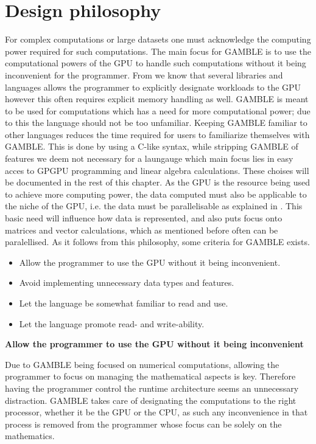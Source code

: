 \section{Design philosophy}
For complex computations or large datasets one must acknowledge the computing power required for such computations.
The main focus for GAMBLE is to use the computational powers of the GPU to handle such computations without it being inconvenient for the programmer.
From  we know that several libraries and languages allows the programmer to explicitly designate workloads to the GPU however this often requires explicit memory handling as well.
GAMBLE is meant to be used for computations which has a need for more computational power; due to this the language should not be too unfamiliar.
Keeping GAMBLE familiar to other languages reduces the time required for users to familiarize themselves with GAMBLE.
This is done by using a C-like syntax, while stripping GAMBLE of features we deem not necessary for a laungauge which main focus lies in easy acces to GPGPU programming and linear algebra calculations.
These choises will be documented in the rest of this chapter.
As the GPU is the resource being used to achieve more computing power, the data computed must also be applicable to the niche of the GPU, i.e. the data must be parallelisable as explained in .
This basic need will influence how data is represented, and also puts focus onto matrices and vector calculations, which as mentioned before often can be paralellised.
As it follows from this philosophy, some criteria for GAMBLE exists.
\begin{itemize}
	\item Allow the programmer to use the GPU without it being inconvenient.
	\item Avoid implementing unnecessary data types and features.
	\item Let the language be somewhat familiar to read and use.
	\item Let the language promote read- and write-ability.
\end{itemize}

\textbf{Allow the programmer to use the GPU without it being inconvenient}

Due to GAMBLE being focused on numerical computations, allowing the programmer to focus on managing the mathematical aspects is key.
Therefore having the programmer control the runtime architecture seems an unnecessary distraction.
GAMBLE takes care of designating the computations to the right processor, whether it be the GPU or the CPU, as such any inconvenience in that process is removed from the programmer whose focus can be solely on the mathematics.

